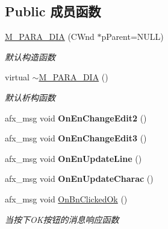 \subsection*{Public 成员函数}
\begin{DoxyCompactItemize}
\item 
\mbox{\label{class_m___p_a_r_a___d_i_a_a48afe90e65a6b5b795660771a979dead}} 
\hyperlink{class_m___p_a_r_a___d_i_a_a48afe90e65a6b5b795660771a979dead}{M\+\_\+\+P\+A\+R\+A\+\_\+\+D\+IA} (C\+Wnd $\ast$p\+Parent=N\+U\+LL)
\begin{DoxyCompactList}\small\item\em 默认构造函数 \end{DoxyCompactList}\item 
\mbox{\label{class_m___p_a_r_a___d_i_a_a773b615a0195eef82f905a622b986730}} 
virtual \hyperlink{class_m___p_a_r_a___d_i_a_a773b615a0195eef82f905a622b986730}{$\sim$\+M\+\_\+\+P\+A\+R\+A\+\_\+\+D\+IA} ()
\begin{DoxyCompactList}\small\item\em 默认析构函数 \end{DoxyCompactList}\item 
\mbox{\label{class_m___p_a_r_a___d_i_a_a65b051cfe602cb62465fbe415c5f9855}} 
afx\+\_\+msg void {\bfseries On\+En\+Change\+Edit2} ()
\item 
\mbox{\label{class_m___p_a_r_a___d_i_a_a27389e0288e070d6b6754db0a8e4d46a}} 
afx\+\_\+msg void {\bfseries On\+En\+Change\+Edit3} ()
\item 
\mbox{\label{class_m___p_a_r_a___d_i_a_ada46b2ff3644d52d8afeb67bdae02c7b}} 
afx\+\_\+msg void {\bfseries On\+En\+Update\+Line} ()
\item 
\mbox{\label{class_m___p_a_r_a___d_i_a_af5179b1264d23370b538c5a946122b32}} 
afx\+\_\+msg void {\bfseries On\+En\+Update\+Charac} ()
\item 
\mbox{\label{class_m___p_a_r_a___d_i_a_afffa042b90b31b6d38bf33792096d908}} 
afx\+\_\+msg void \hyperlink{class_m___p_a_r_a___d_i_a_afffa042b90b31b6d38bf33792096d908}{On\+Bn\+Clicked\+Ok} ()
\begin{DoxyCompactList}\small\item\em 当按下\+O\+K按钮的消息响应函数 \end{DoxyCompactList}\end{DoxyCompactItemize}
